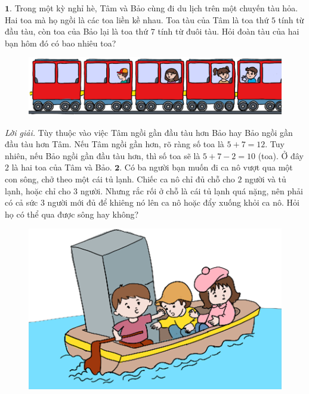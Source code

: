\begin{multicols}{2}
	$\pmb{1.}$ Trong một kỳ nghỉ hè, Tâm và Bảo cùng đi du lịch trên một chuyến tàu hỏa. Hai toa mà họ ngồi là các toa liền kề nhau. Toa tàu của Tâm là toa thứ $5$ tính từ đầu tàu, còn toa  của Bảo lại là toa thứ $7$ tính từ đuôi tàu. Hỏi đoàn tàu của hai bạn hôm đó có bao nhiêu toa?
	\begin{figure}[H]
		\vspace*{-5pt}
		\centering
		\captionsetup{labelformat= empty, justification=centering}
		\includegraphics[width= 1\linewidth]{b1}
		\vspace*{-15pt}
	\end{figure}
	\textit{Lời giải.} Tùy thuộc vào việc Tâm ngồi gần đầu tàu hơn Bảo hay Bảo ngồi gần đầu tàu hơn Tâm.
	\vskip 0.1cm
	Nếu Tâm ngồi gần hơn, rõ ràng số toa là $5+7=12$.
	\vskip 0.1cm
	Tuy nhiên, nếu Bảo ngồi gần đầu tàu hơn, thì số toa sẽ là $5+7-2=10$ (toa).
	\vskip 0.1cm
	Ở đây $2$ là hai toa của Tâm và Bảo.
	\vskip 0.1cm
	$\pmb{2.}$	Có ba người bạn muốn đi ca nô vượt qua một con sông, chở theo một cái tủ lạnh. Chiếc ca nô chỉ đủ chỗ cho $2$ người và tủ lạnh, hoặc chỉ cho $3$ người. Nhưng rắc rối ở chỗ là cái tủ lạnh quá nặng, nên phải có cả sức $3$ người mới đủ để khiêng nó lên ca nô hoặc đẩy xuống khỏi ca nô. Hỏi họ có thể qua được sông hay không?
	\begin{figure}[H]
		\vspace*{-10pt}
		\centering
		\captionsetup{labelformat= empty, justification=centering}
		\includegraphics[width= 1\linewidth]{b2}

\end{figure}
\end{multicols}
